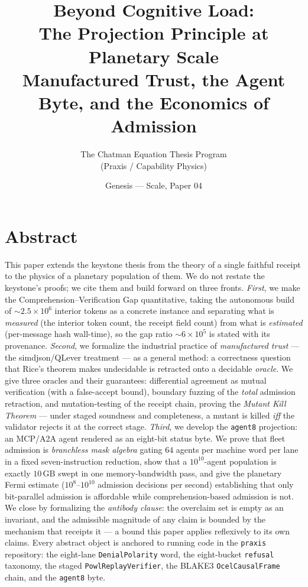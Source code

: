 \documentclass[11pt,oneside]{book}
\title{\bfseries Beyond Cognitive Load:\\[0.4em]
\large The Projection Principle at Planetary Scale\\
\large Manufactured Trust, the Agent Byte, and the Economics of Admission}
\author{The Chatman Equation Thesis Program \\ (Praxis / Capability Physics)}
\date{Genesis --- Scale, Paper 04}
\theoremstyle{definition}
\theoremstyle{plain}
\theoremstyle{remark}
\newcommand{\code}[1]{\texttt{#1}}
\begin{document}
\frontmatter
\maketitle

\chapter*{Abstract}
This paper extends the keystone thesis \cite{chatman2025} from the theory of a single faithful receipt to the physics of a planetary population of them. %
We do not restate the keystone's proofs; we cite them and build forward on three fronts. %
\emph{First}, we make the Comprehension--Verification Gap quantitative, taking the autonomous build of $\sim\!2.5\times 10^{6}$ interior tokens as a concrete instance and separating what is \emph{measured} (the interior token count, the receipt field count) from what is \emph{estimated} (per-message hash wall-time), so the gap ratio $\sim\!6\times 10^{5}$ is stated with its provenance. %
\emph{Second}, we formalize the industrial practice of \emph{manufactured trust} --- the simdjson/QLever treatment --- as a general method: a correctness question that Rice's theorem \cite{rice1953} makes undecidable is retracted onto a decidable \emph{oracle}. %
We give three oracles and their guarantees: differential agreement as mutual verification (with a false-accept bound), boundary fuzzing of the \emph{total} admission retraction, and mutation-testing of the receipt chain, proving the \emph{Mutant Kill Theorem} --- under staged soundness and completeness, a mutant is killed \emph{iff} the validator rejects it at the correct stage. %
\emph{Third}, we develop the \code{agent8} projection: an MCP/A2A agent rendered as an eight-bit status byte. %
We prove that fleet admission is \emph{branchless mask algebra} gating $64$ agents per machine word per lane in a fixed seven-instruction reduction, show that a $10^{10}$-agent population is exactly $10\,\mathrm{GB}$ swept in one memory-bandwidth pass, and give the planetary Fermi estimate ($10^{8}$--$10^{10}$ admission decisions per second) establishing that only bit-parallel admission is affordable while comprehension-based admission is not. %
We close by formalizing the \emph{antibody clause}: the overclaim set is empty as an invariant, and the admissible magnitude of any claim is bounded by the mechanism that receipts it --- a bound this paper applies reflexively to its own claims. %
Every abstract object is anchored to running code in the \code{praxis} repository: the eight-lane \code{DenialPolarity} word, the eight-bucket \code{refusal} taxonomy, the staged \code{PowlReplayVerifier}, the BLAKE3 \code{OcelCausalFrame} chain, and the \code{agent8} byte. %
\end{document}
